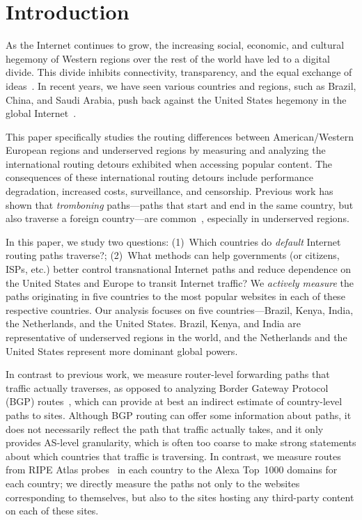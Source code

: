 \section{Introduction}
\label{sec:intro}

As the Internet continues to grow, the increasing social, economic, and cultural 
hegemony of Western regions over the rest of the world have led to a digital divide.  This 
divide inhibits connectivity, transparency, and the equal exchange of ideas~\cite{hegemony}. In 
recent years, we have seen various countries and regions, such as Brazil, China, and Saudi Arabia, push back against the United States hegemony in the global Internet~\cite{hegemony2, hegemony_china,
hegemony_EU}.  

This paper specifically studies the routing differences between American/Western European regions and 
underserved regions by measuring and analyzing the international routing detours exhibited when 
accessing popular content. The consequences of these international routing detours include performance 
degradation, increased costs, surveillance, and censorship.  Previous work has shown that {\it tromboning}
paths---paths that start and end in the same country, but also traverse a
foreign country---are common~\cite{shah2015characterizing,gupta2014peering}, especially in 
underserved regions.  

In this paper, we study two questions: (1)~Which countries do {\em   default}
Internet routing paths traverse?; (2)~What methods can  help governments (or citizens, 
ISPs, etc.) better control transnational Internet paths and reduce dependence on the United States and 
Europe to transit Internet traffic?  We {\em actively
measure} the paths originating in five countries to the most popular
websites in each of these respective countries.
Our analysis focuses on five countries---Brazil,
Kenya, India, the Netherlands, and the United States. Brazil, Kenya, and India are representative of 
underserved regions in the world, and the Netherlands and the United States represent 
more dominant global powers.   

In contrast to previous work, we measure router-level
forwarding paths that traffic actually traverses, as opposed to analyzing Border
Gateway Protocol (BGP)
routes~\cite{karlin2009nation,shah2015characterizing}, which can provide at
best an indirect estimate of country-level paths to sites.
Although BGP routing can offer some information about paths, it does not
necessarily reflect the path that traffic actually takes, and it only provides
AS-level granularity, which is often too coarse to make strong statements
about which countries that traffic is traversing.  In contrast, we measure
routes from RIPE Atlas probes~\cite{ripe_atlas} in each country to the Alexa
Top~1000 domains for each country; we directly measure the paths not only to
the websites corresponding to themselves, but also to the sites hosting any
third-party content on each of these sites.

